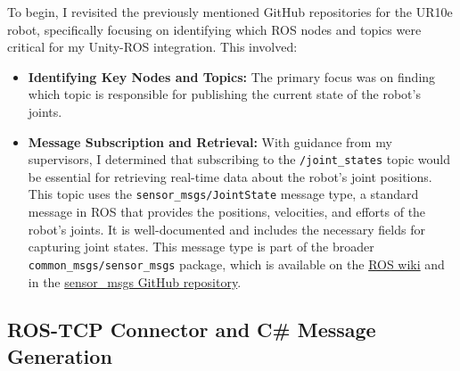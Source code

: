     To begin, I revisited the previously mentioned GitHub repositories for the UR10e robot, specifically focusing on identifying which ROS nodes and topics were critical for my Unity-ROS integration. This involved:
    \begin{itemize}
        \item \textbf{Identifying Key Nodes and Topics:} The primary focus was on 
        finding which topic is responsible for publishing the current state of the robot’s joints.
        \item \textbf{Message Subscription and Retrieval:} With guidance from my supervisors, I determined that subscribing to the \texttt{/joint\_states} topic would be essential for retrieving real-time data about the robot's joint positions.  This topic uses the \texttt{sensor\_msgs/JointState} message type, a standard message in ROS that provides the positions, velocities, and efforts of the robot's joints. It is well-documented and includes the necessary fields for capturing joint states. This message type is part of the broader \texttt{common\_msgs/sensor\_msgs} package, which is available on the \href{https://wiki.ros.org/sensor_msgs}{ROS wiki} and in the \href{https://github.com/ros/common_msgs/tree/noetic-devel/sensor_msgs/msg}{sensor\_msgs GitHub repository}.
    \end{itemize}
    
    \subsection{ROS-TCP Connector and C\# Message Generation}
    

